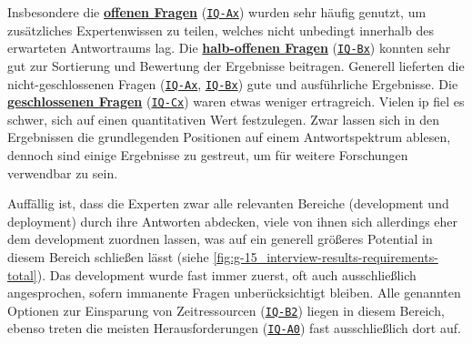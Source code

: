 Insbesondere die \textbf{\hyperref[subsec:AA-01-01_open-questions]{offenen Fragen}} (\texttt{\hyperref[subsec:AA-01-01_open-questions]{IQ-Ax}}) wurden sehr häufig genutzt, um zusätzliches Expertenwissen zu teilen, welches nicht unbedingt innerhalb des erwarteten Antwortraums lag. Die \textbf{\hyperref[subsec:AA-01-02_half-open-questions]{halb-offenen Fragen}} (\texttt{\hyperref[subsec:AA-01-02_half-open-questions]{IQ-Bx}}) konnten sehr gut zur Sortierung und Bewertung der Ergebnisse beitragen. Generell lieferten die nicht-geschlossenen Fragen (\texttt{\hyperref[subsec:AA-01-01_open-questions]{IQ-Ax}}, \texttt{\hyperref[subsec:AA-01-02_half-open-questions]{IQ-Bx}}) gute und ausführliche Ergebnisse. Die \textbf{\hyperref[subsec:AA-01-03_closed-questions]{geschlossenen Fragen}} (\texttt{\hyperref[subsec:AA-01-03_closed-questions]{IQ-Cx}}) waren etwas weniger ertragreich. Vielen \acrlong{ip} fiel es schwer, sich auf einen quantitativen Wert festzulegen. Zwar lassen sich in den Ergebnissen die grundlegenden Positionen auf einem Antwortspektrum ablesen, dennoch sind einige Ergebnisse zu gestreut, um für weitere Forschungen verwendbar zu sein.

Auffällig ist, dass die Experten zwar alle relevanten Bereiche (\Gls{development} und \Gls{deployment}) durch ihre Antworten abdecken, viele von ihnen sich allerdings eher dem \Gls{development} zuordnen lassen, was auf ein generell größeres Potential in diesem Bereich schließen lässt (siehe \autoref{fig:g-15_interview-results-requirements-total}). Das \Gls{development} wurde fast immer zuerst, oft auch ausschließlich angesprochen, sofern immanente Fragen unberücksichtigt bleiben. Alle genannten Optionen zur Einsparung von Zeitressourcen (\texttt{\hyperref[subsec:AA-03-02_half-open-questions]{IQ-B2}}) liegen in diesem Bereich, ebenso treten die meisten Herausforderungen (\texttt{\hyperref[subsec:AA-03-01_open-questions]{IQ-A0}}) fast ausschließlich dort auf.

